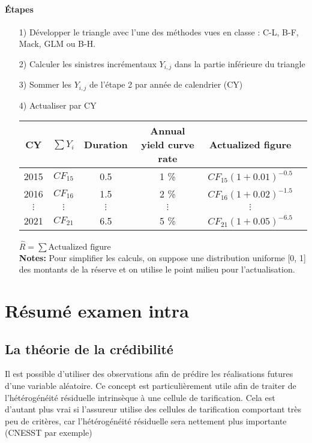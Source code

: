 \documentclass[11pt,french]{report}
\begin{document}
\subsubsection*{Étapes}
\begin{itemize}
\item[1)] Développer le triangle avec l'une des méthodes vues en classe : C-L, B-F, Mack, GLM ou B-H.
\item[2)] Calculer les sinistres incrémentaux $Y_{i,j}$ dans la partie inférieure du triangle
\item[3)] Sommer les $Y_{i,j}$ de l'étape 2 par année de calendrier (CY)
\item[4)] Actualiser par CY

\begin{center}
\begin{tabular}{|c|c|c|c|c|c|}
  \hline
   CY & $\sum Y_i$ & Duration & Annual yield curve rate & Actualized figure \\
  \hline
  2015 & $CF_{15}$ & 0.5 & 1 \% & $CF_{15} (1 + 0.01)^{-0.5}$ \\
  2016 & $CF_{16}$ & 1.5 & 2 \% &  $CF_{16} (1 + 0.02)^{-1.5}$\\
  $\vdots$ & $\vdots$ & $\vdots$ & $\vdots$ & $\vdots$  \\
  2021 & $CF_{21}$ & 6.5 & 5 \% & $CF_{21} (1 + 0.05)^{-6.5}$  \\
  \hline
\end{tabular}
\end{center}
\bigskip
$ \widehat{R} = \sum \text{Actualized figure}$ 
\\

\textbf{Notes:} Pour simplifier les calculs, on suppose une distribution uniforme [0, 1] des montants de la réserve et on utilise le point milieu pour l'actualisation.
\end{itemize}




\appendix
\chapter{Résumé examen intra}

\section{La théorie de la crédibilité} 

Il est possible d'utiliser des observations afin de prédire les réalisations futures d'une variable aléatoire. Ce concept est particulièrement utile afin de traiter de l'hétérogénéité résiduelle intrinsèque à une cellule de tarification. Cela est d'autant plus vrai si l'assureur utilise des cellules de tarification comportant très peu de critères, car l'hétérogénéité résiduelle sera nettement plus importante (CNESST par exemple)
\end{document}

